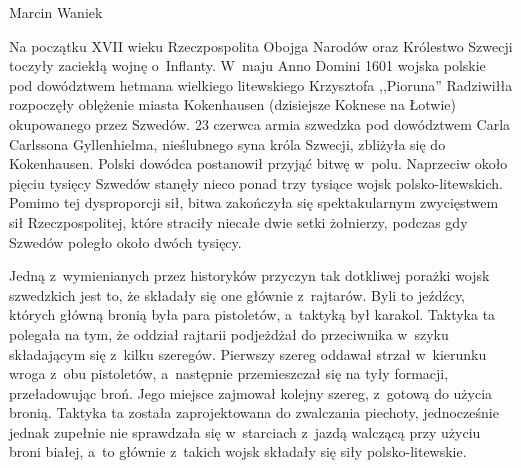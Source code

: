 

{Marcin Waniek}


Na początku XVII wieku Rzeczpospolita Obojga Narodów oraz Królestwo Szwecji toczyły zaciekłą wojnę o~Inflanty. W~maju Anno Domini 1601 wojska polskie pod dowództwem hetmana wielkiego litewskiego Krzysztofa ,,Pioruna'' Radziwiłła rozpoczęły oblężenie miasta Kokenhausen (dzisiejsze Koknese na Łotwie) okupowanego przez Szwedów. 23 czerwca armia szwedzka pod dowództwem Carla Carlssona Gyllenhielma, nieślubnego syna króla Szwecji, zbliżyła się do Kokenhausen. Polski dowódca postanowił przyjąć bitwę w~polu.
Naprzeciw około pięciu tysięcy Szwedów stanęły nieco ponad trzy tysiące wojsk polsko-litewskich. 
Pomimo tej dysproporcji sił, bitwa zakończyła się spektakularnym zwycięstwem sił Rzeczpospolitej, które straciły niecałe dwie setki żołnierzy, podczas gdy Szwedów poległo około dwóch tysięcy.

Jedną z~wymienianych przez historyków przyczyn tak dotkliwej porażki wojsk szwedzkich jest to, że składały się one głównie z~rajtarów.
Byli to jeźdźcy, których główną bronią była para pistoletów, %
a~taktyką był karakol. Taktyka ta polegała na tym, że oddział rajtarii podjeżdżał do przeciwnika w~szyku składającym się z~kilku szeregów. Pierwszy szereg oddawał strzał w~kierunku wroga z~obu pistoletów, a~następnie przemieszczał się na tyły formacji, przeładowując broń. Jego miejsce zajmował kolejny szereg, z~gotową do użycia bronią.
Taktyka ta została zaprojektowana do zwalczania piechoty, jednocześnie jednak zupełnie nie sprawdzała się w~starciach z~jazdą walczącą przy użyciu broni białej, a~to głównie z~takich wojsk składały się siły polsko-litewskie.

